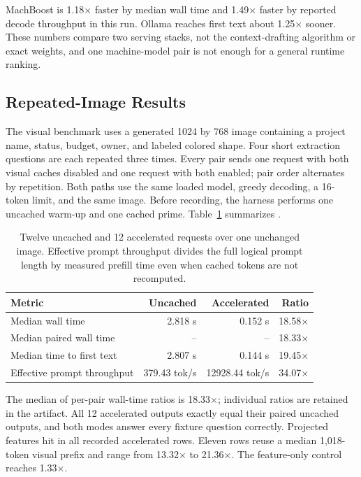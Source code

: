 \documentclass[11pt]{article}
\begin{document}
MachBoost is 1.18$\times$ faster by median wall time and 1.49$\times$ faster by reported decode throughput in this run. Ollama reaches first text about 1.25$\times$ sooner. These numbers compare two serving stacks, not the context-drafting algorithm or exact weights, and one machine-model pair is not enough for a general runtime ranking.

\subsection{Repeated-Image Results}
The visual benchmark uses a generated 1024 by 768 image containing a project name, status, budget, owner, and labeled colored shape. Four short extraction questions are each repeated three times. Every pair sends one request with both visual caches disabled and one request with both enabled; pair order alternates by repetition. Both paths use the same loaded model, greedy decoding, a 16-token limit, and the same image. Before recording, the harness performs one uncached warm-up and one cached prime. Table~\ref{tab:vision} summarizes .

\begin{table}[H]
\centering
\small
\begin{tabular}{lrrr}
\toprule
Metric & Uncached & Accelerated & Ratio \\
\midrule
Median wall time & 2.818 s & 0.152 s & 18.58$\times$ \\
Median paired wall time & -- & -- & 18.33$\times$ \\
Median time to first text & 2.807 s & 0.144 s & 19.45$\times$ \\
Effective prompt throughput & 379.43 tok/s & 12928.44 tok/s & 34.07$\times$ \\
\bottomrule
\end{tabular}
\caption{Twelve uncached and 12 accelerated requests over one unchanged image. Effective prompt throughput divides the full logical prompt length by measured prefill time even when cached tokens are not recomputed.}
\label{tab:vision}
\end{table}

The median of per-pair wall-time ratios is 18.33$\times$; individual ratios are retained in the artifact. All 12 accelerated outputs exactly equal their paired uncached outputs, and both modes answer every fixture question correctly. Projected features hit in all recorded accelerated rows. Eleven rows reuse a median 1,018-token visual prefix and range from 13.32$\times$ to 21.36$\times$. The feature-only control reaches 1.33$\times$.
\end{document}
